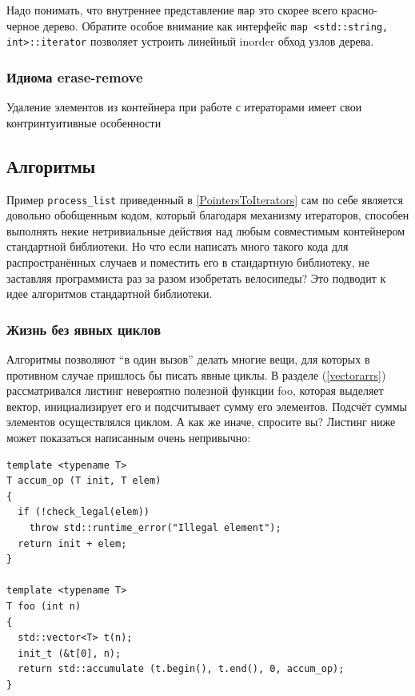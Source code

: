 \documentclass[a4paper,12pt,oneside]{article}
\begin{document}
Надо понимать, что внутреннее представление \lstinline!map! это скорее всего красно-черное дерево. Обратите особое внимание как интерфейс \lstinline!map <std::string, int>::iterator! позволяет устроить линейный inorder обход узлов дерева.

\subsubsection{Идиома erase-remove}

Удаление элементов из контейнера при работе с итераторами имеет свои контринтуитивные особенности

\subsection{Алгоритмы}

Пример \lstinline!process_list! приведенный в \ref{PointersToIterators} сам по себе является довольно обобщенным кодом, который благодаря механизму итераторов, способен выполнять некие нетривиальные действия над любым совместимым контейнером стандартной библиотеки. Но что если написать много такого кода для распространённых случаев и поместить его в стандартную библиотеку, не заставляя программиста раз за разом изобретать велосипеды? Это подводит к идее алгоритмов стандартной библиотеки.

\subsubsection{Жизнь без явных циклов}

Алгоритмы позволяют ``в один вызов'' делать многие вещи, для которых в противном случае пришлось бы писать явные циклы. В разделе (\ref{vectorarrs}) рассматривался листинг невероятно полезной функции foo, которая выделяет вектор, инициализирует его и подсчитывает сумму его элементов. Подсчёт суммы элементов осуществлялся циклом. А как же иначе, спросите вы? Листинг ниже может показаться написанным очень непривычно:

\begin{lstlisting}
template <typename T>
T accum_op (T init, T elem)
{
  if (!check_legal(elem))
    throw std::runtime_error("Illegal element");
  return init + elem;
}

template <typename T>
T foo (int n)
{
  std::vector<T> t(n);
  init_t (&t[0], n);
  return std::accumulate (t.begin(), t.end(), 0, accum_op);
}
\end{lstlisting}
\end{document}
